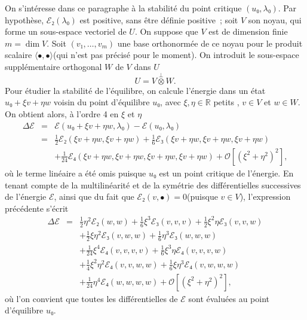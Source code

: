 \documentclass[12pt, final]{amsart}
\theoremstyle{definition}
\begin{document}
On s'intéresse dans ce paragraphe à la stabilité du point critique \((u₀, λ₀) .\) Par hypothèse, \(ℰ₂(λ₀)\) est positive, sans être définie positive~; soit \(V\) son noyau, qui forme un sous-espace vectoriel de \(U\). On suppose que \(V\) est de dimension finie \(m = \dim V\). Soit \((v₁, \ldots, v_m)\) une base orthonormée de ce noyau pour le produit scalaire \(〈 •, • 〉\)(qui n'est pas précisé pour le moment). On introduit le sous-espace supplémentaire orthogonal \(W\) de \(V\) dans \(U\)
\begin{equation}
  U = V \overset{\perp}{\otimes} W.
\end{equation}
Pour étudier la stabilité de l'équilibre, on calcule l'énergie dans un état \(u₀ + ξ v + η w\) voisin du point d'équilibre \(u₀\), avec \(ξ, η∈\mathbb{R}\) {\guillemotleft} petits {\guillemotright}, \(v \in V\) et \(w∈W\). On obtient alors, à l'ordre 4 en \(ξ\) et \(η\)
\begin{eqnarray}
  \Delta ℰ & = & ℰ(u₀ + ξ v + η w, λ₀)
  -ℰ(u₀, λ₀) \nonumber\\
  & = & \tfrac{1}{2} ℰ₂(ξ v + η w, ξ v + η w) +
  \tfrac{1}{6} ℰ₃(ξ v + η w, ξ v + η w, ξ v + η w)
  \nonumber\\
  &  &  + \tfrac{1}{24} ℰ₄(ξ v + η w, ξ v + η
  w, ξ v + η w, ξ v + η w) +\mathcal{O} [(ξ^2 + η^2)^2],
\end{eqnarray}
où le terme linéaire a été omis puisque \(u₀\) est un point critique de l'énergie. En tenant compte de la multilinéarité et de la symétrie des différentielles successives de l'énergie \(ℰ\), ainsi que du fait que \(ℰ₂(v, •) = 0\)(puisque \(v∈V\)), l'expression précédente s'écrit
\begin{eqnarray}
  \Delta ℰ & = & \tfrac{1}{2} η^2 ℰ₂(w, w) +
  \tfrac{1}{6} ξ^3 ℰ₃(v, v, v) + \tfrac{1}{2} ξ^2 η
  ℰ₃(v, v, w) \nonumber\\
  &  & + \tfrac{1}{2} ξ η^2 ℰ₃(v, w, w) + \tfrac{1}{6}
  η^3 ℰ₃(w, w, w) \nonumber\\
  &  & + \tfrac{1}{24} ξ^4 ℰ₄(v, v, v, v) + \tfrac{1}{6} ξ^3
  η ℰ₄(v, v, v, w) \nonumber\\
  &  & + \tfrac{1}{4} ξ^2 η^2 ℰ₄(v, v, w, w) + \tfrac{1}{6}
  ξ η^3 ℰ₄(v, w, w, w) \nonumber\\
  &  & + \tfrac{1}{24} η^4 ℰ₄(w, w, w, w) +\mathcal{O} [(ξ^2
  + η^2)^2],
\end{eqnarray}
où l'on convient que toutes les différentielles de \(ℰ\) sont évaluées au point d'équilibre \(u₀\).
\end{document}
